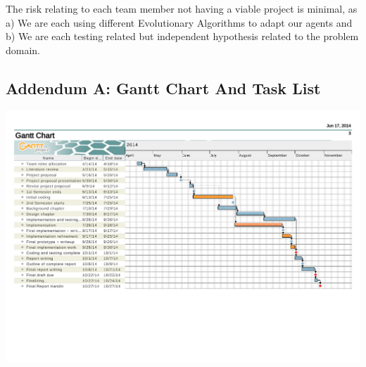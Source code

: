 \documentclass[a4paper,12pt]{article}
\begin{document}
The risk relating to each team member not having a viable project is minimal, as a) We are each using different Evolutionary Algorithms to adapt our agents and b) We are each testing related but independent hypothesis related to the problem domain.



\begin{landscape}
\appendix
\section{Addendum A: Gantt Chart And Task List}
\centering
\includegraphics[scale=0.3]{ganttchart}
\end{landscape}
\end{document}
